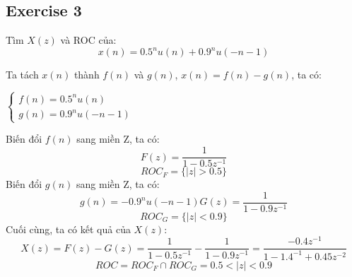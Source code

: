 \subsection{Exercise 3}
Tìm $X(z)$ và ROC của:
\[
x(n) = 0.5^n u(n) + 0.9^n u(-n-1)
\]

Ta tách $x(n)$ thành $f(n)$ và $g(n)$, $x(n) = f(n) - g(n)$, ta có:
\begin{center}
    $\begin{cases}
        f(n) = 0.5^nu(n)\\
        g(n) = 0.9^nu(-n-1)
    \end{cases}$
\end{center}
Biến đổi $f(n)$ sang miền Z, ta có:\\
\[
F(z) = \frac{1}{1-0.5z^{-1}}
\]
\[
ROC_F = \{|z| > 0.5\}
\]
Biến đổi $g(n)$ sang miền Z, ta có:\\
\[
g(n) = -0.9^nu(-n-1)
G(z) = \frac{1}{1-0.9z^{-1}}
\]
\[
ROC_G = \{|z| < 0.9\}
\]
Cuối cùng, ta có kết quả của $X(z)$:
\[
X(z) = F(z) - G(z) = \frac{1}{1-0.5z^{-1}} - \frac{1}{1-0.9z^{-1}} = \frac{-0.4z^{-1}}{1 - 1.4^{-1} + 0.45z^{-2}}
\]
\[
ROC = ROC_F \cap ROC_G = {0.5 < |z| < 0.9}
\]